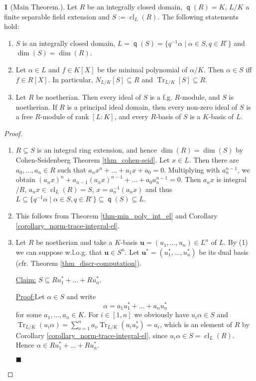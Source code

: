 \documentclass[12pt,a4paper]{report}
\theoremstyle{definition}
\theoremstyle{num.custom-title}
\newtheorem{teo_custom-title}[theorem]{} %
\newenvironment{claim}[1]{\par\noindent\underline{Claim#1:}\space}{} %
\newenvironment{claimproof}[1]{\par\noindent\underline{Proof:}\space#1}{\leavevmode\unskip\penalty9999 \hbox{}\nobreak\hfill\quad\hbox{$\blacksquare$}} %
\DeclareMathOperator{\sse}{\subseteq}
\DeclareMathOperator{\cl}{cl}
\DeclareMathOperator{\Tr}{Tr}
\DeclareMathOperator{\q}{\mathsf{q}}
\renewcommand{\u}{\mathbf{u}}
\begin{document}
\begin{teo_custom-title}[Main Theorem.]\label{main-thm}
Let $R$ be an integrally closed domain, $\q(R)=K$, $L/K$ a finite separable field extension and $S:=\cl_L(R)$. The following statements hold:
\begin{enumerate}
\item $S$ is an integrally closed domain, $L = \q(S) = \{q^{-1}\alpha \mid \alpha \in S, q \in R^\circ\}$ and $\dim(S) = \dim(R)$.
\item Let $\alpha \in L$ and $f \in K[X]$ be the minimal polynomial of $\alpha/K$. Then $\alpha \in S$ iff $f \in R[X]$. In particular, $N_{L/K}[S] \sse R$ and $\Tr_{L/K}[S] \sse R$.
\item Let $R$ be noetherian. Then every ideal of $S$ is a f.g. $R$-module, and $S$ is noetherian. If $R$ is a principal ideal domain, then every non-zero ideal of $S$ is a free $R$-module of rank $[L:K]$, and every $R$-basis of $S$ is a $K$-basis of $L$.
\end{enumerate}
\begin{proof}\ 
\begin{enumerate}
\item $R \sse S$ is an integral ring extension, and hence $\dim(R) = \dim(S)$ by Cohen-Seidenberg Theorem \ref{thm_cohen-seid}. Let $x \in L$. Then there are $a_0,...,a_n \in R$ such that $a_n x^n + ... + a_1 x + a_0 = 0$. Multiplying with $a_n^{n-1}$, we obtain $(a_n x)^n + a_{n-1} (a_n x)^{n-1} + ... + a_0 a_n^{n-1} = 0$. Then $a_n x$ is integral$/R$, $a_n x \in \cl_L(R) = S$, $x = a_n^{-1} (a_n x)$ and thus $L \sse \{q^{-1}\alpha \mid \alpha \in S, q \in R^\circ\} \sse \q(S) \sse L$.
\item This follows from Theorem \ref{thm-min_poly_int_el} and Corollary \ref{corollary_norm-trace-integral-el}.
\item Let $R$ be noetherian and take a $K$-basis $\u = (u_1,...,u_n) \in L^n$ of $L$. By (1) we can suppose w.l.o.g. that $\u \in S^n$. Let $\u^* = (u_1^*,...,u_n^*)$ be its dual basis (cfr. Theorem \ref{thm_discr-computation}). 
\begin{claim}{} $S \sse R u_1^* + \ldots + R u_n^*$.
\begin{claimproof}
Let $\alpha \in S$ and write
\[
\alpha = a_1 u_1^* + ... + a_n u_n^*
\]
for some $a_1,...,a_n \in K$. For $i \in [1,n]$ we obviously have $u_i \alpha \in S$ and $\Tr_{L/K}(u_i \alpha) = \sum_{\nu=1}^n a_\nu \Tr_{L/K} (u_i u_\nu^*) = a_i$, which is an element of $R$ by Corollary \ref{corollary_norm-trace-integral-el}, since $u_i \alpha \in S = \cl_L(R)$. Hence $\alpha \in R u_1^* + ... + R u_n^*$.

\end{claimproof}
\end{claim}
\end{enumerate}
\end{proof}
\end{teo_custom-title}
\end{document}
